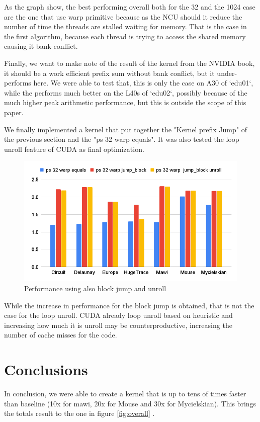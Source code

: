 \documentclass[conference]{IEEEtran}
\begin{document}
As the graph show, the best performing overall both for the 32 and the 1024 case are the one that use warp primitive because as the NCU should it reduce the number of time the threads are stalled waiting for memory. That is the case in the first algorithm, because each thread is trying to access the shared memory causing it bank conflict.

Finally, we want to make note of the result of the kernel from the NVIDIA book, it should be a work efficient prefix sum without bank conflict, but it under-performs here. We were able to test that, this is only the case on A30 of `edu01`, while the performs much better on the L40s of `edu02`, possibly because of the much higher peak arithmetic performance, but this is outside the scope of this paper.

We finally implemented a kernel that put together the "Kernel prefix Jump" of the previous section and the "ps 32 warp equals". It was also tested the loop unroll feature of CUDA as final optimization.

\begin{figure}[h!]
	\centering
	\includegraphics[width=1\linewidth]{data_images/last-prefix}
	\caption{Performance using also block jump and unroll}
	\label{fig:last-prefix}
\end{figure}

While the increase in performance for the block jump is obtained, that is not the case for the loop unroll. CUDA already loop unroll based on heuristic and increasing how much it is unroll may be counterproductive, increasing the number of cache misses for the code.


\section{Conclusions}
In conclusion, we were able to create a kernel that is up to tens of times faster than baseline (10x for mawi, 20x for Mouse and 30x for Mycielskian). This brings the totals result to the one in figure \ref{fig:overall} .
\end{document}
